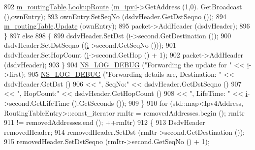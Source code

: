 \begin{DoxyCode}
892               \hyperlink{classns3_1_1dsdv_1_1RoutingProtocol_acc4cee466c2591e35f508ce58097a00e}{m\_routingTable}.\hyperlink{classns3_1_1dsdv_1_1RoutingTable_a0bfb9dc677f02bd740973865e38df763}{LookupRoute} (\hyperlink{classns3_1_1dsdv_1_1RoutingProtocol_a955477c7f38e64762a264c24e3762af6}{m\_ipv4}->GetAddress (1,0).
      GetBroadcast (),ownEntry);
893               ownEntry.SetSeqNo (dsdvHeader.GetDstSeqno ());
894               \hyperlink{classns3_1_1dsdv_1_1RoutingProtocol_acc4cee466c2591e35f508ce58097a00e}{m\_routingTable}.\hyperlink{classns3_1_1dsdv_1_1RoutingTable_a651762730975f809c720313b1332cb99}{Update} (ownEntry);
895               packet->AddHeader (dsdvHeader);
896             \}
897           \textcolor{keywordflow}{else}
898             \{
899               dsdvHeader.SetDst (\hyperlink{bernuolliDistribution_8m_a6f6ccfcf58b31cb6412107d9d5281426}{i}->second.GetDestination ());
900               dsdvHeader.SetDstSeqno ((\hyperlink{bernuolliDistribution_8m_a6f6ccfcf58b31cb6412107d9d5281426}{i}->second.GetSeqNo ()));
901               dsdvHeader.SetHopCount (\hyperlink{bernuolliDistribution_8m_a6f6ccfcf58b31cb6412107d9d5281426}{i}->second.GetHop () + 1);
902               packet->AddHeader (dsdvHeader);
903             \}
904           \hyperlink{group__logging_ga413f1886406d49f59a6a0a89b77b4d0a}{NS\_LOG\_DEBUG} (\textcolor{stringliteral}{"Forwarding the update for "} << \hyperlink{bernuolliDistribution_8m_a6f6ccfcf58b31cb6412107d9d5281426}{i}->first);
905           \hyperlink{group__logging_ga413f1886406d49f59a6a0a89b77b4d0a}{NS\_LOG\_DEBUG} (\textcolor{stringliteral}{"Forwarding details are, Destination: "} << dsdvHeader.GetDst ()
906                                                                 << \textcolor{stringliteral}{", SeqNo:"} << dsdvHeader.GetDstSeqno ()
907                                                                 << \textcolor{stringliteral}{", HopCount:"} << dsdvHeader.GetHopCount 
      ()
908                                                                 << \textcolor{stringliteral}{", LifeTime: "} << 
      \hyperlink{bernuolliDistribution_8m_a6f6ccfcf58b31cb6412107d9d5281426}{i}->second.GetLifeTime ().GetSeconds ());
909         \}
910       \textcolor{keywordflow}{for} (std::map<Ipv4Address, RoutingTableEntry>::const\_iterator rmItr = removedAddresses.begin (); 
      rmItr
911            != removedAddresses.end (); ++rmItr)
912         \{
913           DsdvHeader removedHeader;
914           removedHeader.SetDst (rmItr->second.GetDestination ());
915           removedHeader.SetDstSeqno (rmItr->second.GetSeqNo () + 1);

\end{DoxyCode}
